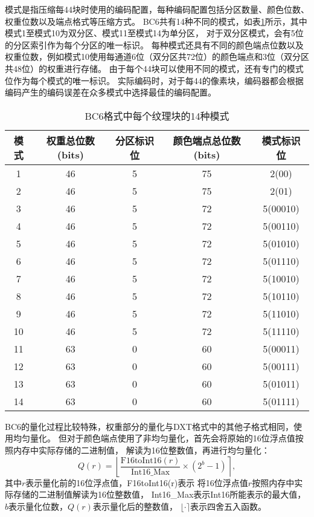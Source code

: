 模式是指压缩每4\times4块时使用的编码配置，每种编码配置包括分区数量、颜色位数、权重位数以及端点格式等压缩方式。
BC6共有14种不同的模式，如表\ref{tab:BC6Mode}所示，其中模式1至模式10为双分区、模式11至模式14为单分区，
对于双分区模式，会有5位的分区索引作为每个分区的唯一标识。
每种模式还具有不同的颜色端点位数以及权重位数，例如模式10使用每通道6位（双分区共72位）的颜色端点和3位（双分区共48位）的权重进行存储。
由于每个4\times4块可以使用不同的模式，还有专门的模式位作为每个模式的唯一标识。
实际编码时，对于每4\times4的像素块，编码器都会根据编码产生的编码误差在众多模式中选择最佳的编码配置。

\begin{table}[htbp]
    \centering
    \caption{BC6格式中每个纹理块的14种模式\cite{BC6H}}
    \label{tab:BC6Mode}        
    \begin{tabular}{ccccc}
    \toprule
    模式 & 权重总位数(bits) & 分区标识位 & 颜色端点总位数(bits) & 模式标识位\\
    \midrule
    1   &   46    &  5  &   75  &   2(00)   \\
    2   &   46    &  5  &   75  &   2(01)   \\
    3   &   46    &  5  &   72  &   5(00010)   \\
    4   &   46    &  5  &   72  &   5(00110)   \\
    5   &   46    &  5  &   72  &   5(01010)   \\
    6   &   46    &  5  &   72  &   5(01110)   \\
    7   &   46    &  5  &   72  &   5(10010)   \\
    8   &   46    &  5  &   72  &   5(10110)   \\
    9   &   46    &  5  &   72  &   5(11010)   \\
    10  &   46    &  5  &   72  &   5(11110)   \\
    11  &   63    &  0  &   60  &   5(00011)   \\
    12  &   63    &  0  &   60  &   5(00111)   \\
    13  &   63    &  0  &   60  &   5(01011)   \\
    14  &   63    &  0  &   60  &   5(01111)   \\
    \bottomrule
    \end{tabular}
\end{table}

BC6的量化过程比较特殊，权重部分的量化与DXT格式中的其他子格式相同，使用均匀量化。
但对于颜色端点使用了非均匀量化，首先会将原始的16位浮点值按照内存中实际存储的二进制值，
解读为16位整数值，再进行均匀量化：
\begin{equation}
    Q(r)=\left \lfloor \frac{\text{F16toInt16}(r)}{\text{Int16\_Max}} \times (2^{b}-1) \right \rceil,
\end{equation}
其中$r$表示量化前的16位浮点值，F16toInt16(r)表示
将16位浮点值$r$按照内存中实际存储的二进制值解读为16位整数值，
Int16\_Max表示Int16所能表示的最大值，
$b$表示量化位数，$Q(r)$表示量化后的整数值，
$\lfloor \cdot \rceil$表示四舍五入函数。

